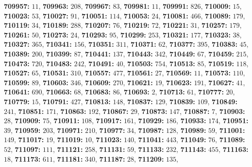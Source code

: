 \textsf{\bfseries 709957:} $11$, \textsf{\bfseries 709963:} $208$, \textsf{\bfseries 709967:} $83$, \textsf{\bfseries 709981:} $11$, \textsf{\bfseries 709991:} $826$, \textsf{\bfseries 710009:} $15$, \textsf{\bfseries 710023:} $53$, \textsf{\bfseries 710027:} $91$, \textsf{\bfseries 710051:} $114$, \textsf{\bfseries 710053:} $24$, \textsf{\bfseries 710081:} $466$, \textsf{\bfseries 710089:} $179$, \textsf{\bfseries 710119:} $34$, \textsf{\bfseries 710189:} $288$, \textsf{\bfseries 710207:} $76$, \textsf{\bfseries 710219:} $72$, \textsf{\bfseries 710221:} $31$, \textsf{\bfseries 710257:} $179$, \textsf{\bfseries 710261:} $50$, \textsf{\bfseries 710273:} $24$, \textsf{\bfseries 710293:} $95$, \textsf{\bfseries 710299:} $253$, \textsf{\bfseries 710321:} $177$, \textsf{\bfseries 710323:} $38$, \textsf{\bfseries 710327:} $365$, \textsf{\bfseries 710341:} $156$, \textsf{\bfseries 710351:} $311$, \textsf{\bfseries 710371:} $62$, \textsf{\bfseries 710377:} $395$, \textsf{\bfseries 710383:} $45$, \textsf{\bfseries 710389:} $200$, \textsf{\bfseries 710399:} $87$, \textsf{\bfseries 710441:} $137$, \textsf{\bfseries 710443:} $342$, \textsf{\bfseries 710449:} $67$, \textsf{\bfseries 710459:} $215$, \textsf{\bfseries 710473:} $720$, \textsf{\bfseries 710483:} $242$, \textsf{\bfseries 710491:} $40$, \textsf{\bfseries 710503:} $754$, \textsf{\bfseries 710513:} $85$, \textsf{\bfseries 710519:} $118$, \textsf{\bfseries 710527:} $65$, \textsf{\bfseries 710531:} $310$, \textsf{\bfseries 710557:} $477$, \textsf{\bfseries 710561:} $27$, \textsf{\bfseries 710569:} $11$, \textsf{\bfseries 710573:} $110$, \textsf{\bfseries 710599:} $89$, \textsf{\bfseries 710603:} $346$, \textsf{\bfseries 710609:} $270$, \textsf{\bfseries 710621:} $19$, \textsf{\bfseries 710623:} $191$, \textsf{\bfseries 710627:} $41$, \textsf{\bfseries 710641:} $690$, \textsf{\bfseries 710663:} $68$, \textsf{\bfseries 710683:} $86$, \textsf{\bfseries 710693:} $2$, \textsf{\bfseries 710713:} $61$, \textsf{\bfseries 710777:} $20$, \textsf{\bfseries 710779:} $15$, \textsf{\bfseries 710791:} $427$, \textsf{\bfseries 710813:} $148$, \textsf{\bfseries 710837:} $129$, \textsf{\bfseries 710839:} $109$, \textsf{\bfseries 710849:} $241$, \textsf{\bfseries 710851:} $171$, \textsf{\bfseries 710863:} $192$, \textsf{\bfseries 710867:} $29$, \textsf{\bfseries 710873:} $147$, \textsf{\bfseries 710887:} $7$, \textsf{\bfseries 710903:} $28$, \textsf{\bfseries 710909:} $75$, \textsf{\bfseries 710911:} $108$, \textsf{\bfseries 710917:} $161$, \textsf{\bfseries 710929:} $186$, \textsf{\bfseries 710933:} $174$, \textsf{\bfseries 710951:} $39$, \textsf{\bfseries 710959:} $203$, \textsf{\bfseries 710971:} $210$, \textsf{\bfseries 710977:} $34$, \textsf{\bfseries 710987:} $128$, \textsf{\bfseries 710989:} $59$, \textsf{\bfseries 711001:} $149$, \textsf{\bfseries 711017:} $19$, \textsf{\bfseries 711019:} $10$, \textsf{\bfseries 711023:} $140$, \textsf{\bfseries 711041:} $443$, \textsf{\bfseries 711049:} $76$, \textsf{\bfseries 711089:} $52$, \textsf{\bfseries 711097:} $111$, \textsf{\bfseries 711121:} $258$, \textsf{\bfseries 711131:} $59$, \textsf{\bfseries 711133:} $232$, \textsf{\bfseries 711143:} $455$, \textsf{\bfseries 711163:} $18$, \textsf{\bfseries 711173:} $611$, \textsf{\bfseries 711181:} $340$, \textsf{\bfseries 711187:} $28$, \textsf{\bfseries 711209:} $135$, 
